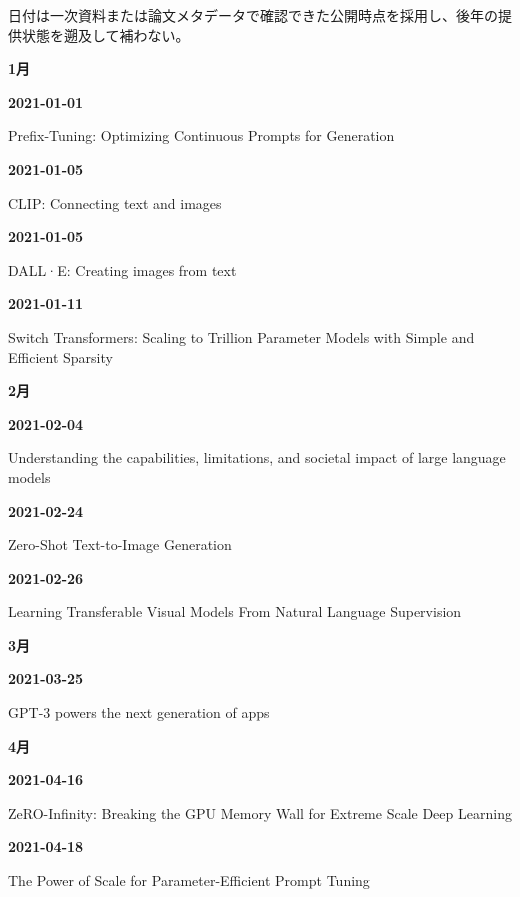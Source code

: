 \noindent 日付は一次資料または論文メタデータで確認できた公開時点を採用し、後年の提供状態を遡及して補わない。
\par\medskip
\medskip
\noindent\textbf{1月}\par
\smallskip
\noindent\textbf{2021-01-01}\par
{\raggedright Prefix-Tuning: Optimizing Continuous Prompts for Generation\par}
\smallskip
\noindent\textbf{2021-01-05}\par
{\raggedright CLIP: Connecting text and images\par}
\smallskip
\noindent\textbf{2021-01-05}\par
{\raggedright DALL·E: Creating images from text\par}
\smallskip
\noindent\textbf{2021-01-11}\par
{\raggedright Switch Transformers: Scaling to Trillion Parameter Models with Simple and Efficient Sparsity\par}
\smallskip
\medskip
\noindent\textbf{2月}\par
\smallskip
\noindent\textbf{2021-02-04}\par
{\raggedright Understanding the capabilities, limitations, and societal impact of large language models\par}
\smallskip
\noindent\textbf{2021-02-24}\par
{\raggedright Zero-Shot Text-to-Image Generation\par}
\smallskip
\noindent\textbf{2021-02-26}\par
{\raggedright Learning Transferable Visual Models From Natural Language Supervision\par}
\smallskip
\medskip
\noindent\textbf{3月}\par
\smallskip
\noindent\textbf{2021-03-25}\par
{\raggedright GPT-3 powers the next generation of apps\par}
\smallskip
\medskip
\noindent\textbf{4月}\par
\smallskip
\noindent\textbf{2021-04-16}\par
{\raggedright ZeRO-Infinity: Breaking the GPU Memory Wall for Extreme Scale Deep Learning\par}
\smallskip
\noindent\textbf{2021-04-18}\par
{\raggedright The Power of Scale for Parameter-Efficient Prompt Tuning\par}
\smallskip
